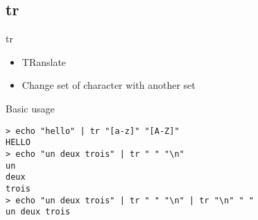 \subsection{tr}

\begin{frame}[fragile]{tr}
  \begin{itemize}
    \pause \item TRanslate
    \pause \item Change set of character with another set
  \end{itemize}
  \pause

  \begin{exampleblock}{Basic usage}
    \begin{lstlisting}[showstringspaces=false,basicstyle=\tiny]
> echo "hello" | tr "[a-z]" "[A-Z]"
HELLO
> echo "un deux trois" | tr " " "\n"
un
deux
trois
> echo "un deux trois" | tr " " "\n" | tr "\n" " "
un deux trois
    \end{lstlisting}
  \end{exampleblock}
\end{frame}
